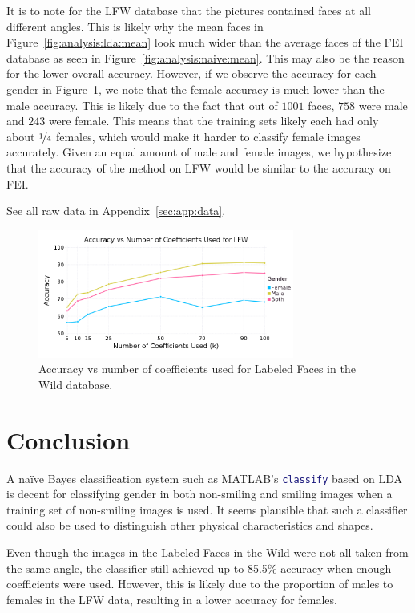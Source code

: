 \documentclass[hidelinks,11pt]{article}
\begin{document}
It is to note for the LFW database that the
pictures contained faces at all different angles. This is likely why the mean
faces in Figure~\ref{fig:analysis:lda:mean} look much wider than the average
faces of the FEI database as seen in Figure~\ref{fig:analysis:naive:mean}. This
may also be the reason for the lower overall accuracy. However, if we observe
the accuracy for each gender in Figure~\ref{fig:analysis:lda:accuracy_lfw}, we
note that the female accuracy is much lower than the male accuracy. This is
likely due to the fact that out of $1001$ faces, $758$ were male and $243$ were
female. This means that the training sets likely each had only about
$\nicefrac{1}{4}$ females, which would make it harder to classify female images
accurately. Given an equal amount of male and female images, we hypothesize that
the accuracy of the method on LFW would be similar to the accuracy on FEI.

See all raw data in Appendix~\ref{sec:app:data}.

\begin{figure}[!ht]
  \centering
  \includegraphics[width=0.75\textwidth]{accuracy_k_lfw.png}
  \caption{Accuracy vs number of coefficients used for Labeled Faces in the
  Wild database.}
  \label{fig:analysis:lda:accuracy_lfw}
\end{figure}

\section{Conclusion}
\label{sec:conclusion}

A na\"ive Bayes classification system such as MATLAB's
\lstinline[language=Matlab]!classify! based on LDA is decent for classifying
gender in both non-smiling and smiling images when a training set of non-smiling
images is used. It seems plausible that such a classifier could also be used to
distinguish other physical characteristics and shapes. 

Even though the images in the Labeled Faces in the Wild were not all taken from
the same angle, the classifier still achieved up to 85.5\% accuracy when enough
coefficients were used. However, this is likely due to the proportion of males
to females in the LFW data, resulting in a lower accuracy for females.
\end{document}
